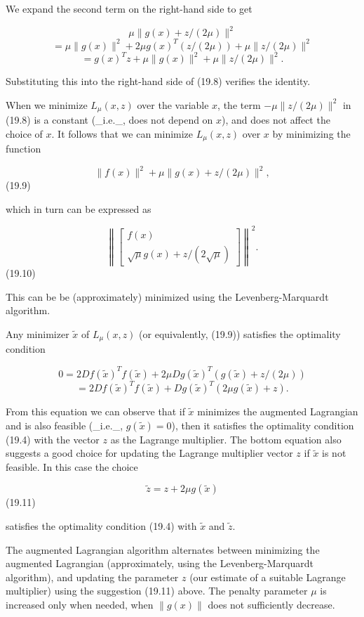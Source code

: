 We expand the second term on the right-hand side to get

\[\mu\|g(x)+z/(2\mu)\|^{2}\] \[= \mu\|g(x)\|^{2}+2\mu g(x)^{T}(z/(2\mu))+\mu\|z/(2\mu)\|^{2}\] \[= g(x)^{T}z+\mu\|g(x)\|^{2}+\mu\|z/(2\mu)\|^{2}.\]

Substituting this into the right-hand side of (19.8) verifies the identity.

When we minimize \(L_{\mu}(x,z)\) over the variable \(x\), the term \(-\mu\|z/(2\mu)\|^{2}\) in (19.8) is a constant (_i.e._, does not depend on \(x\)), and does not affect the choice of \(x\). It follows that we can minimize \(L_{\mu}(x,z)\) over \(x\) by minimizing the function

\[\|f(x)\|^{2}+\mu\|g(x)+z/(2\mu)\|^{2},\] (19.9)

which in turn can be expressed as

\[\left\|\left[\begin{array}{c}f(x)\\ \sqrt{\mu}g(x)+z/(2\sqrt{\mu})\end{array}\right]\right\|^{2}.\] (19.10)

This can be be (approximately) minimized using the Levenberg-Marquardt algorithm.

Any minimizer \(\tilde{x}\) of \(L_{\mu}(x,z)\) (or equivalently, (19.9)) satisfies the optimality condition

\[0 = 2Df(\tilde{x})^{T}f(\tilde{x})+2\mu Dg(\tilde{x})^{T}(g(\tilde{x })+z/(2\mu))\] \[= 2Df(\tilde{x})^{T}f(\tilde{x})+Dg(\tilde{x})^{T}(2\mu g(\tilde{x })+z).\]

From this equation we can observe that if \(\tilde{x}\) minimizes the augmented Lagrangian and is also feasible (_i.e._, \(g(\tilde{x})=0\)), then it satisfies the optimality condition (19.4) with the vector \(z\) as the Lagrange multiplier. The bottom equation also suggests a good choice for updating the Lagrange multiplier vector \(z\) if \(\tilde{x}\) is not feasible. In this case the choice

\[\tilde{z}=z+2\mu g(\tilde{x})\] (19.11)

satisfies the optimality condition (19.4) with \(\tilde{x}\) and \(\tilde{z}\).

The augmented Lagrangian algorithm alternates between minimizing the augmented Lagrangian (approximately, using the Levenberg-Marquardt algorithm), and updating the parameter \(z\) (our estimate of a suitable Lagrange multiplier) using the suggestion (19.11) above. The penalty parameter \(\mu\) is increased only when needed, when \(\|g(x)\|\) does not sufficiently decrease.

 